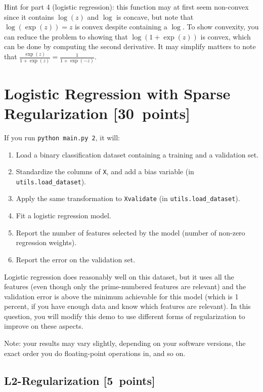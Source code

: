 \documentclass{article}
\newcommand\pts[1]{\textcolor{pointscolour}{[#1~points]}}
\begin{document}
Hint for part 4 (logistic regression): this function may at first seem non-convex since it contains $\log(z)$ and $\log$ is concave, but note that $\log(\exp(z))=z$ is convex despite containing a $\log$. To show convexity, you can reduce the problem to showing that $\log(1+\exp(z))$ is convex, which can be done by computing the second derivative. It may simplify matters to note that $\frac{\exp(z)}{1+\exp(z)} = \frac{1}{1+\exp(-z)}$.


\clearpage
\section{Logistic Regression with Sparse Regularization \pts{30}}

If you run  \verb|python main.py 2|, it will:
\begin{enumerate}
\item Load a binary classification dataset containing a training and a validation set.
\item Standardize the columns of \verb|X|, and add a bias variable (in \verb|utils.load_dataset|).
\item Apply the same transformation to \verb|Xvalidate| (in \verb|utils.load_dataset|).
\item Fit a logistic regression model.
\item Report the number of features selected by the model (number of non-zero regression weights).
\item Report the error on the validation set.
\end{enumerate}
Logistic regression does reasonably well on this dataset,
but it uses all the features (even though only the prime-numbered features are relevant)
and the validation error is above the minimum achievable for this model
(which is 1 percent, if you have enough data and know which features are relevant).
In this question, you will modify this demo to use different forms of regularization
 to improve on these aspects.

Note: your results may vary slightly, depending on your software versions, the exact order you do floating-point operations in, and so on.


\subsection{L2-Regularization \pts{5}}
\end{document}
